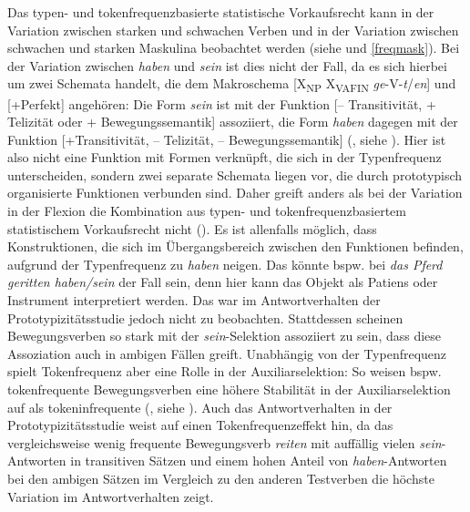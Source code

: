 \begin{sloppypar}
Das typen- und tokenfrequenzbasierte statistische Vorkaufsrecht kann in der Variation zwischen starken und schwachen Verben und in der Variation zwischen schwachen und starken Maskulina beobachtet werden (siehe  und \ref{freqmask}). Bei der Variation zwischen \textit{haben} und \textit{sein} ist dies nicht der Fall, da es sich hierbei um zwei Schemata handelt, die dem Makroschema [X\textsubscript{NP} X\textsubscript{VAFIN} \textit{ge}-V-\textit{t}/\textit{en}] und [+Perfekt] angehören: Die Form \textit{sein} ist mit der Funktion [-- Transitivität, + Telizität oder + Bewegungssemantik] assoziiert, die Form \textit{haben} dagegen mit der Funktion [+Transitivität, -- Telizität, -- Bewegungssemantik] (\cite[316--319]{Gillmann.2016}, siehe ). Hier ist also nicht eine Funktion mit Formen verknüpft, die sich in der Typenfrequenz unterscheiden, sondern zwei separate Schemata liegen vor, die durch prototypisch organisierte Funktionen verbunden sind. Daher greift anders als bei der Variation in der Flexion die Kombination aus typen- und tokenfrequenzbasiertem statistischem Vorkaufsrecht nicht (\cite[74--94]{Goldberg.2019}). Es ist allenfalls möglich, dass Konstruktionen, die sich im Übergangsbereich zwischen den Funktionen befinden,  aufgrund der Typenfrequenz zu \textit{haben} neigen. Das könnte bspw. bei \textit{das Pferd geritten haben/sein} der Fall sein, denn hier kann das Objekt als Patiens oder Instrument interpretiert werden. Das war im Antwortverhalten der Prototypizitätsstudie jedoch nicht zu beobachten. Stattdessen scheinen Bewegungsverben so stark mit der \textit{sein}-Selektion assoziiert zu sein, dass diese Assoziation auch in ambigen Fällen greift. Unabhängig von der Typenfrequenz spielt Tokenfrequenz aber eine Rolle in der Auxiliarselektion: So weisen bspw. tokenfrequente Bewegungsverben eine höhere Stabilität in der Auxiliarselektion auf als tokeninfrequente (\cite[272--274]{Gillmann.2016}, siehe ). Auch das Antwortverhalten in der Prototypizitätsstudie weist auf einen Tokenfrequenzeffekt hin, da das vergleichsweise wenig frequente Bewegungsverb \textit{reiten} mit auffällig vielen \textit{sein}-Antworten in transitiven Sätzen und einem hohen Anteil von \textit{haben}-Antworten bei den ambigen Sätzen im Vergleich zu den anderen Testverben die höchste Variation im Antwortverhalten zeigt. 
\end{sloppypar}

